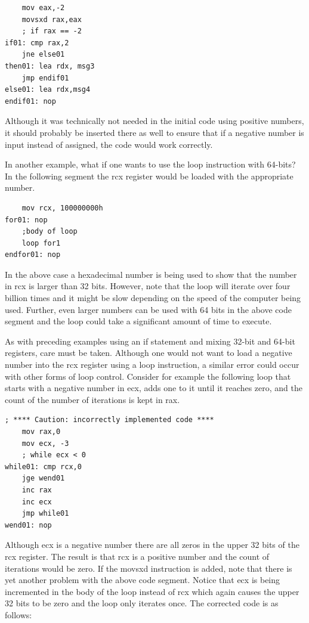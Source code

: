 \documentclass[10pt]{article}
\begin{document}
\begin{verbatim}
    mov eax,-2
    movsxd rax,eax
    ; if rax == -2
if01: cmp rax,2
    jne else01
then01: lea rdx, msg3
    jmp endif01
else01: lea rdx,msg4
endif01: nop
\end{verbatim}

Although it was technically not needed in the initial code using positive numbers, it should probably be inserted there as well to ensure that if a negative number is input instead of assigned, the code would work correctly.

In another example, what if one wants to use the loop instruction with 64-bits? In the following segment the rcx register would be loaded with the appropriate number.

\begin{verbatim}
    mov rcx, 100000000h
for01: nop
    ;body of loop
    loop for1
endfor01: nop
\end{verbatim}

In the above case a hexadecimal number is being used to show that the number in rcx is larger than 32 bits. However, note that the loop will iterate over four billion times and it might be slow depending on the speed of the computer being used. Further, even larger numbers can be used with 64 bits in the above code segment and the loop could take a significant amount of time to execute.

As with preceding examples using an if statement and mixing 32-bit and 64-bit registers, care must be taken. Although one would not want to load a negative number into the rcx register using a loop instruction, a similar error could occur with other forms of loop control. Consider for example the following loop that starts with a negative number in ecx, adds one to it until it reaches zero, and the count of the number of iterations is kept in rax.

\begin{verbatim}
; **** Caution: incorrectly implemented code ****
    mov rax,0
    mov ecx, -3
    ; while ecx < 0
while01: cmp rcx,0
    jge wend01
    inc rax
    inc ecx
    jmp while01
wend01: nop
\end{verbatim}

Although ecx is a negative number there are all zeros in the upper 32 bits of the rcx register. The result is that rcx is a positive number and the count of iterations would be zero. If the movsxd instruction is added, note that there is yet another problem with the above code segment. Notice that ecx is being incremented in the body of the loop instead of rcx which again causes the upper 32 bits to be zero and the loop only iterates once. The corrected code is as follows:
\end{document}
